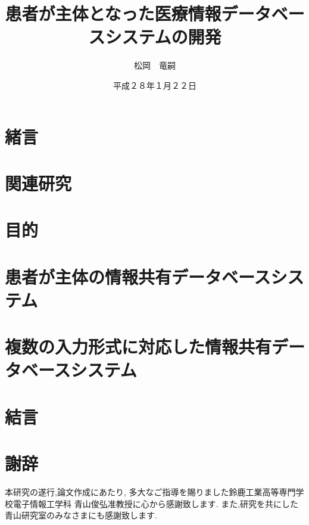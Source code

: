 \documentclass[12pt]{sotsuron}
\title{患者が主体となった医療情報データベースシステムの開発}
\author{松岡　竜嗣}
\date{平成２８年１月２２日}
\affiliation{電子機械工学専攻}
\begin{document}
\maketitle

\begin{abstract}

%
\end{abstract}

\tableofcontents
\clearpage



\section{緒言}

\clearpage

\section{関連研究}

\clearpage

\section{目的}

\clearpage

\section{患者が主体の情報共有データベースシステム}

\clearpage

\section{複数の入力形式に対応した情報共有データベースシステム}

\clearpage

\section{結言}

\clearpage


\appendix

\section*{謝辞}
本研究の遂行,論文作成にあたり,
多大なご指導を賜りました鈴鹿工業高等専門学校電子情報工学科
青山俊弘准教授に心から感謝致します.
また,研究を共にした青山研究室のみなさまにも感謝致します.
\end{document}
